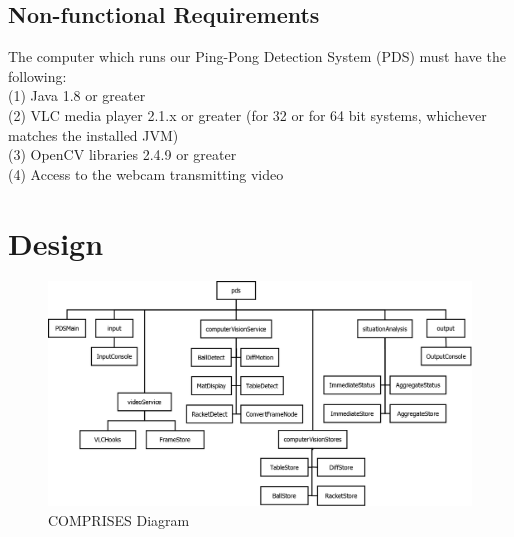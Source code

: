 \documentclass[11pt]{report}
\begin{document}
\section{Non-functional Requirements}
The computer which runs our Ping-Pong Detection System (PDS) must have the following:\\
(1) Java 1.8 or greater\\
(2) VLC media player 2.1.x or greater (for 32 or for 64 bit systems, whichever matches the installed JVM)\\
(3) OpenCV libraries 2.4.9 or greater\\
(4) Access to the webcam transmitting video\\

\chapter{Design}

\begin{figure}[!h]
\begin{center}
\includegraphics[width=1.05\textwidth]{Design-Comprises.png}
\end{center}
\caption{\small{COMPRISES Diagram}}
\label{fig:comprises}
\end{figure}
\end{document}
